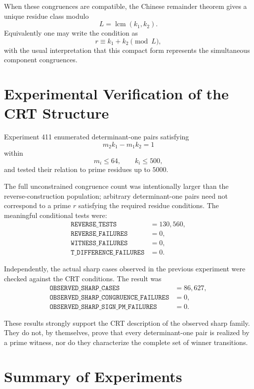 \documentclass[11pt,a4paper]{article}
\begin{document}
When these congruences are compatible, the Chinese remainder theorem gives a unique residue class modulo
\[
    L=\operatorname{lcm}(k_1,k_2).
\]
Equivalently one may write the condition as
\begin{equation}
    r\equiv k_1+k_2
    \pmod{L},
\end{equation}
with the usual interpretation that this compact form represents the simultaneous component congruences.

\section{Experimental Verification of the CRT Structure}

Experiment 411 enumerated determinant-one pairs satisfying
\[
    m_2k_1-m_1k_2=1
\]
within
\[
    m_i\le64,
    \qquad
    k_i\le500,
\]
and tested their relation to prime residues up to $5000$.

The full unconstrained congruence count was intentionally larger than the reverse-construction population; arbitrary determinant-one pairs need not correspond to a prime $r$ satisfying the required residue conditions. The meaningful conditional tests were:
\begin{align*}
    \texttt{REVERSE\_TESTS}&=130{,}560,\\
    \texttt{REVERSE\_FAILURES}&=0,\\
    \texttt{WITNESS\_FAILURES}&=0,\\
    \texttt{T\_DIFFERENCE\_FAILURES}&=0.
\end{align*}

Independently, the actual sharp cases observed in the previous experiment were checked against the CRT conditions. The result was
\begin{align*}
    \texttt{OBSERVED\_SHARP\_CASES}&=86{,}627,\\
    \texttt{OBSERVED\_SHARP\_CONGRUENCE\_FAILURES}&=0,\\
    \texttt{OBSERVED\_SHARP\_SIGN\_PM\_FAILURES}&=0.
\end{align*}

These results strongly support the CRT description of the observed sharp family. They do not, by themselves, prove that every determinant-one pair is realized by a prime witness, nor do they characterize the complete set of winner transitions.

\section{Summary of Experiments}
\end{document}
